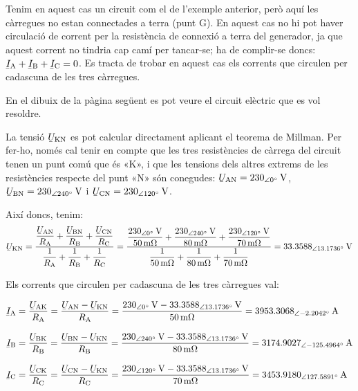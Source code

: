 	
\begin{exemple}[\MillmanTrifNoNeutre{}]
	\addcontentsxms{\MillmanTrifNoNeutre}	
    Tenim en aquest cas un circuit com el de l'exemple anterior, però aquí les càrregues no estan connectades a terra (punt G). En aquest cas no hi pot haver circulació de corrent per la resistència de connexió a terra del generador, ja que aquest corrent no tindria cap camí per tancar-se; ha de complir-se doncs: $\cmplx{I}\ped{A} + \cmplx{I}\ped{B} + \cmplx{I}\ped{C} = 0$. Es tracta de trobar en aquest cas els corrents que circulen per cadascuna de les tres càrregues.

    En el dibuix de la pàgina següent es pot veure el circuit elèctric que es vol resoldre.

   
    La tensió $\cmplx{U}\ped{KN}$ es pot calcular directament aplicant el teorema de Millman. Per fer-ho, només cal tenir en compte que les tres resistències de càrrega del circuit tenen un punt comú que és «K», i que les tensions dels altres extrems de les resistències respecte del punt «N» són conegudes: $\cmplx{U}\ped{AN}=\qtypd{230}{0}{V}$, $\cmplx{U}\ped{BN}=\qtypd{230}{240}{V}$ i $\cmplx{U}\ped{CN}=\qtypd{230}{120}{V}$.

    Així doncs, tenim:
    \[
    \cmplx{U}\ped{KN} = \frac{ \dfrac{\cmplx{U}\ped{AN}}{R\ped{A}} + \dfrac{\cmplx{U}\ped{BN}}{R\ped{B}} + \dfrac{\cmplx{U}\ped{CN}}{R\ped{C}}} { \dfrac{1}{R\ped{A}} + \dfrac{1}{R\ped{B}} + \dfrac{1}{R\ped{C}}} =
    \frac{\dfrac{\qtypd{230}{0}{V}}{\qty{50}{m\ohm}}+\dfrac{\qtypd{230}{240}{V}}{\qty{80}{m\ohm}}+
    \dfrac{\qtypd{230}{120}{V}}{\qty{70}{m\ohm}}}{\dfrac{1}{\qty{50}{m\ohm}}+\dfrac{1}{\qty{80}{m\ohm}}+
    \dfrac{1}{\qty{70}{m\ohm}}} =
    \qtypd{33,3588}{13,1736}{V}
    \]

	\begin{center}
		
	\end{center}

    Els corrents que circulen per cadascuna de les tres càrregues val:
    
    \begin{align*}
    \cmplx{I}\ped{A} &= \frac{\cmplx{U}\ped{AK}}{R\ped{A}} = \frac{\cmplx{U}\ped{AN} - \cmplx{U}\ped{KN}}{R\ped{A}} = \frac{\qtypd{230}{0}{V}-\qtypd{33,3588}{13,1736}{V}}{\qty{50}{m\ohm}}
    = \qtypd{3953,3068}{-2,2042}{A}\\[2ex]
    \cmplx{I}\ped{B} &= \frac{\cmplx{U}\ped{BK}}{R\ped{B}} = \frac{\cmplx{U}\ped{BN} - \cmplx{U}\ped{KN}}{R\ped{B}} = \frac{\qtypd{230}{240}{V}-\qtypd{33,3588}{13,1736}{V}}{\qty{80}{m\ohm}}
    = \qtypd{3174,9027}{-125,4964}{A}\\[2ex]
    \cmplx{I}\ped{C} &= \frac{\cmplx{U}\ped{CK}}{R\ped{C}} = \frac{\cmplx{U}\ped{CN} - \cmplx{U}\ped{KN}}{R\ped{C}} = \frac{\qtypd{230}{120}{V}-\qtypd{33,3588}{13,1736}{V}}{\qty{70}{m\ohm}}
    = \qtypd{3453,9180}{127,5891}{A}
    \end{align*}
\end{exemple}


